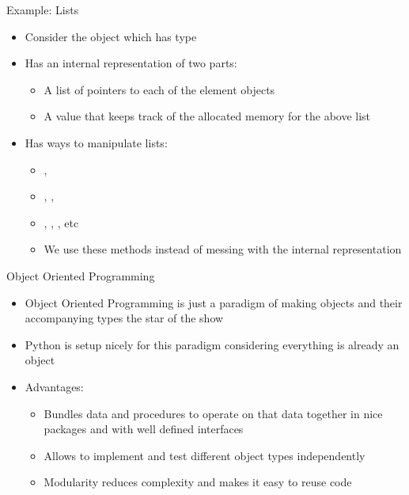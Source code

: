 \documentclass[pdf, aspectratio=169, 12pt]{beamer}
\begin{document}
\begin{frame}{Example: Lists}
	\begin{itemize}
		\item Consider the object \pyi{[2,4,6]} which has type 
		\item Has an \alert{internal representation} of two parts:
			\begin{itemize}
				\item A list of pointers to each of the element objects
				\item A value that keeps track of the allocated memory for the above list
			\end{itemize}
			\begin{center}
			\end{center}
			\pause
		\item Has ways to \alert{manipulate} lists:
			\begin{itemize}
				\item {}, 
				\item {}, , 
				\item {}, , , etc
				\item We use these methods instead of messing with the internal representation
			\end{itemize}
	\end{itemize}
\end{frame}

\begin{frame}{Object Oriented Programming}
	\begin{itemize}
		\item Object Oriented Programming is just a paradigm of making objects and their accompanying types the star of the show
		\item Python is setup nicely for this paradigm considering everything is already an object
		\item Advantages:
			\begin{itemize}
				\item Bundles data and procedures to operate on that data together in nice packages and with well defined interfaces
				\item Allows to implement and test different object types independently
				\item Modularity reduces complexity and makes it easy to reuse code
			\end{itemize}
	\end{itemize}
\end{frame}
\end{document}
